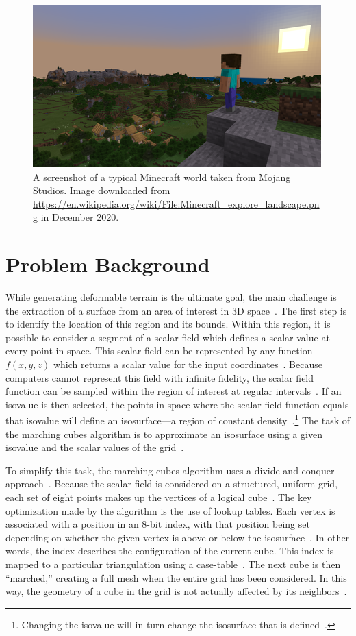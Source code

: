 \documentclass[pageno]{jpaper}
\begin{document}
\begin{figure}[hbt]
\centering
\includegraphics[width=0.75\linewidth]{Minecraft_explore_landscape.png}
\caption{A screenshot of a typical Minecraft world taken from Mojang Studios. Image downloaded from \url{https://en.wikipedia.org/wiki/File:Minecraft_explore_landscape.png} in December 2020.}
\label{fig:minecraft}
\end{figure}

\section{Problem Background}

While generating deformable terrain is the ultimate goal, the main challenge is the extraction of a surface from an area of interest in 3D space~\cite{bourke}. The first step is to identify the location of this region and its bounds. Within this region, it is possible to consider a segment of a scalar field which defines a scalar value at every point in space. This scalar field can be represented by any function $f(x,y,z)$ which returns a scalar value for the input coordinates~\cite{kieran}. Because computers cannot represent this field with infinite fidelity, the scalar field function can be sampled within the region of interest at regular intervals~\cite{kieran}. If an isovalue is then selected, the points in space where the scalar field function equals that isovalue will define an isosurface—a region of constant density~\cite{kieran,lorensen}.\footnote{Changing the isovalue will in turn change the isosurface that is defined~\cite{kieran}.} The task of the marching cubes algorithm is to approximate an isosurface using a given isovalue and the scalar values of the grid~\cite{kieran,bourke}.

To simplify this task, the marching cubes algorithm uses a divide-and-conquer approach~\cite{lorensen,kieran}. Because the scalar field is considered on a structured, uniform grid, each set of eight points makes up the vertices of a logical cube~\cite{lorensen}. The key optimization made by the algorithm is the use of lookup tables. Each vertex is associated with a position in an 8-bit index, with that position being set depending on whether the given vertex is above or below the isosurface~\cite{lorensen,kieran,bourke}. In other words, the index describes the configuration of the current cube. This index is mapped to a particular triangulation using a case-table~\cite{lorensen,kieran,bourke}. The next cube is then “marched,” creating a full mesh when the entire grid has been considered. In this way, the geometry of a cube in the grid is not actually affected by its neighbors~\cite{kieran}.
\end{document}
